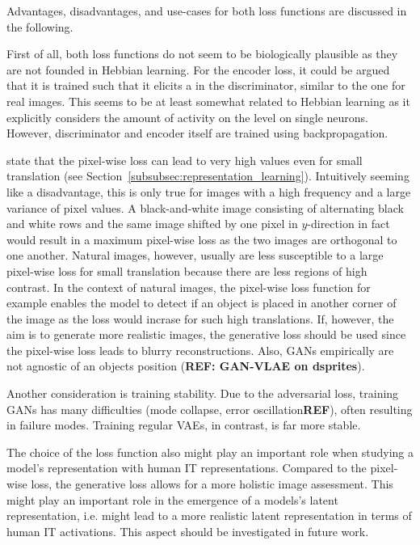 Advantages, disadvantages, and use-cases for both loss functions are discussed in the following.

First of all, both loss functions do not seem to be biologically plausible as they are not founded in Hebbian learning.
For the encoder loss, it could be argued that it is trained such that it elicits a  in the discriminator, similar to the one for real images.
This  seems to be at least somewhat related to Hebbian learning as it explicitly considers the amount of activity on the level on single neurons.
However, discriminator and encoder itself are trained using backpropagation.

\citet{larsen2015autoencoding} state that the pixel-wise loss can lead to very high values even for small translation (see Section~\ref{subsubsec:representation_learning}).
Intuitively seeming like a disadvantage, this is only true for images with a high frequency and a large variance of pixel values.
A black-and-white image consisting of alternating black and white rows and the same image shifted by one pixel in $y$-direction in fact would result in a maximum pixel-wise loss as the two images are orthogonal to one another.
Natural images, however, usually are less susceptible to a large pixel-wise loss for small translation because there are less regions of high contrast.
In the context of natural images, the pixel-wise loss function for example enables the model to detect if an object is placed in another corner of the image as the loss would incrase for such high translations.
If, however, the aim is to generate more realistic images, the generative loss should be used since the pixel-wise loss leads to blurry reconstructions.
Also, \acp{GAN} empirically are not agnostic of an objects position (\textbf{REF: GAN-VLAE on dsprites}).

Another consideration is training stability.
Due to the adversarial loss, training \acp{GAN} has many difficulties (mode collapse, error oscillation\textbf{REF}), often resulting in failure modes.
Training regular \acp{VAE}, in contrast, is far more stable.

The choice of the loss function also might play an important role when studying a model's representation with human \ac{IT} representations.
Compared to the pixel-wise loss, the generative loss allows for a more holistic image assessment.
This might play an important role in the emergence of a models's latent representation, i.e. might lead to a more realistic latent representation in terms of human IT activations.
This aspect should be investigated in future work.

